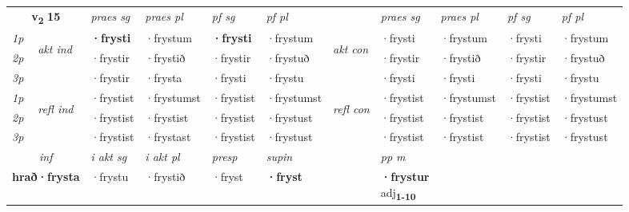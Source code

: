 \noindent
\begin{tabular}{lllllllllll} \toprule
\multicolumn{2}{c}{\textbf{v{\textsubscript{2}}} \Large{\textbf{15}}}  &  \textit{praes sg}  & \textit{praes pl}  &\textit{ pf sg} & \textit{pf pl} &  &  \textit{praes sg}  & \textit{praes pl}  & \textit{pf sg} & \textit{pf pl } \\*
	\cmidrule{3-6} \cmidrule{8-11}
 {\textit{1p}} & \multirow{3}{*}{\begin{turn}{90}\textit{akt ind}\end{turn}} & \textbf{·frysti} & ·frystum & \textbf{·frysti} & ·frystum & \multirow{3}{*}{\begin{turn}{90}\textit{akt con}\end{turn}} &·frysti & ·frystum & ·frysti & ·frystum\\*
 {\textit{2p}} &  &  ·frystir  & ·frystið & ·frystir & ·frystuð & & ·frystir & ·frystið & ·frystir & ·frystuð \\*
{\textit{3p}} &  & ·frystir & ·frysta & ·frysti & ·frystu & & ·frysti & ·frysti& ·frysti & ·frystu \\*
\cmidrule{3-6} \cmidrule{8-11}
 {\textit{1p}} & \multirow{3}{*}{\begin{turn}{90}\textit{refl ind}\end{turn}}  & ·frystist & ·frystumst & ·frystist & ·frystumst & \multirow{3}{*}{\begin{turn}{90}\textit{refl con}\end{turn}}  &·frystist & ·frystumst & ·frystist & ·frystumst \\*
 {\textit{2p}} &  & ·frystist & ·frystist & ·frystist & ·frystust & &·frystist & ·frystist & ·frystist & ·frystust \\*
 {\textit{3p}}  & & ·frystist & ·frystast & ·frystist & ·frystust & & ·frystist & ·frystist& ·frystist & ·frystust \\*
\cmidrule{3-6} \cmidrule{8-11}

   \multicolumn{2}{c}{\textit{inf}}  & \textit{i akt sg} & \textit{i akt pl}   & \textit{presp} & \textit{supin}  && \textit{pp m} \\*
  \multicolumn{2}{c}{\textbf{hrað\allowbreak ·frysta}} & ·frystu  & ·frystið   & ·fryst &  \textbf{·fryst}  && \specialcell{\textbf{·frystur} \\ adj\textbf{\textsubscript{1-10}}} \\*
\end{tabular}

